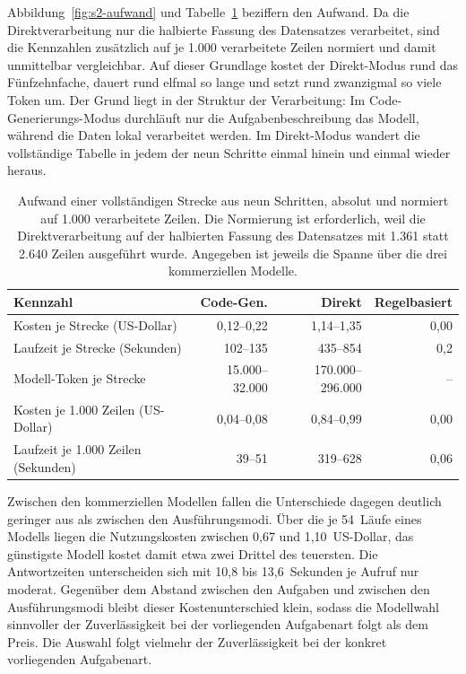 Abbildung~\ref{fig:s2-aufwand} und Tabelle~\ref{tab:aufwand-kpi} beziffern den Aufwand. Da die Direktverarbeitung nur die halbierte Fassung des Datensatzes verarbeitet, sind die Kennzahlen zusätzlich auf je 1.000 verarbeitete Zeilen normiert und damit unmittelbar vergleichbar. Auf dieser Grundlage kostet der Direkt-Modus rund das Fünfzehnfache, dauert rund elfmal so lange und setzt rund zwanzigmal so viele Token um. Der Grund liegt in der Struktur der Verarbeitung: Im Code-Generierungs-Modus durchläuft nur die Aufgabenbeschreibung das Modell, während die Daten lokal verarbeitet werden. Im Direkt-Modus wandert die vollständige Tabelle in jedem der neun Schritte einmal hinein und einmal wieder heraus.

\begin{table}[tb]
    \centering
    \small
    \caption[Aufwand je Ausführungsmodus]{Aufwand einer vollständigen Strecke aus neun Schritten, absolut und normiert auf 1.000 verarbeitete Zeilen. Die Normierung ist erforderlich, weil die Direktverarbeitung auf der halbierten Fassung des Datensatzes mit 1.361 statt 2.640 Zeilen ausgeführt wurde. Angegeben ist jeweils die Spanne über die drei kommerziellen Modelle.}
    \label{tab:aufwand-kpi}
    \begin{tabularx}{\textwidth}{@{}Xrrr@{}}
        \toprule
        \textbf{Kennzahl} & \textbf{Code-Gen.} & \textbf{Direkt} & \textbf{Regelbasiert} \\
        \midrule
        Kosten je Strecke (US-Dollar) & 0,12--0,22 & 1,14--1,35 & 0,00 \\
        Laufzeit je Strecke (Sekunden) & 102--135 & 435--854 & 0,2 \\
        Modell-Token je Strecke & 15.000--32.000 & 170.000--296.000 & -- \\
        \addlinespace
        Kosten je 1.000 Zeilen (US-Dollar) & 0,04--0,08 & 0,84--0,99 & 0,00 \\
        Laufzeit je 1.000 Zeilen (Sekunden) & 39--51 & 319--628 & 0,06 \\
        \bottomrule
    \end{tabularx}
\end{table}


Zwischen den kommerziellen Modellen fallen die Unterschiede dagegen deutlich geringer aus als zwischen den Ausführungsmodi. Über die je 54~Läufe eines Modells liegen die Nutzungskosten zwischen 0,67 und 1,10~US-Dollar, das günstigste Modell kostet damit etwa zwei Drittel des teuersten. Die Antwortzeiten unterscheiden sich mit 10,8 bis 13,6~Sekunden je Aufruf nur moderat. Gegenüber dem Abstand zwischen den Aufgaben und zwischen den Ausführungsmodi bleibt dieser Kostenunterschied klein, sodass die Modellwahl sinnvoller der Zuverlässigkeit bei der vorliegenden Aufgabenart folgt als dem Preis. Die Auswahl folgt vielmehr der Zuverlässigkeit bei der konkret vorliegenden Aufgabenart.

